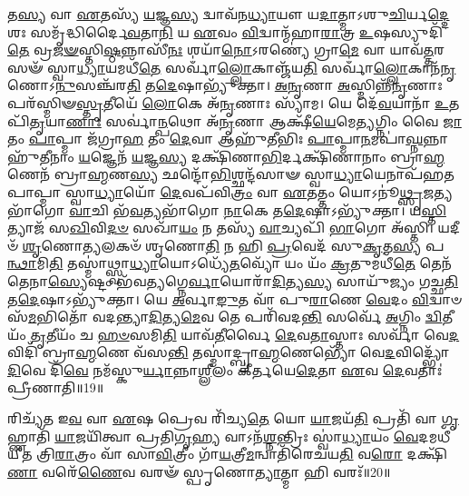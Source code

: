 𑌤\-\ul{𑌸𑍍𑌯} 𑌵𑌾 \ul{𑌏}\-𑌤𑌸𑍍𑌯᳴ \ul{𑌯}\-𑌜𑍍𑌞\-\ul{𑌸𑍍𑌯} 𑌦𑍍𑌵𑌾𑌵᳴𑌨\-\ul{𑌧𑍍𑌯𑌾}\-𑌯𑍗 𑌯\-\ul{𑌦𑌾}\-𑌤𑍍𑌮𑌾𑌽𑌶𑍁\-\ul{𑌚𑌿}\-𑌰𑍍𑌯\-\ul{𑌦𑍍𑌦𑍇}\-𑌶𑌃 𑌸𑌮𑍃᳴𑌦𑍍𑌧𑌿𑌰𑍍𑌦𑍈\-\ul{𑌵}\-𑌤𑌾\-\ul{𑌨𑌿} 𑌯 \ul{𑌏}\-𑌵𑌂 \ul{𑌵𑌿}\-𑌦𑍍𑌵𑌾𑌨𑍍𑌮᳴𑌹𑌾\-\ul{𑌰𑌾}\-𑌤𑍍𑌰 \ul{𑌉}\-𑌷𑌸𑍍𑌯𑍁𑌦𑌿᳴\-\ul{𑌤𑍇} 𑌵𑍍𑌰\-\ul{𑌜}\-\-\ul{𑍟}\-𑌸𑍍𑌤𑌿\-\ul{𑌷𑍍𑌠}\-𑌨𑍍𑌨𑌾\-𑌸𑍀᳴\-\ul{𑌨𑌃} 𑌶𑌯𑌾᳴\-\ul{𑌨𑍋}\-𑌽𑌰𑌣𑍍𑌯𑍇॑ 𑌗𑍍𑌰𑌾\-\ul{𑌮𑍇} 𑌵𑌾 𑌯𑌾𑌵᳴\-\ul{𑌤𑍍𑌤}\-𑌰𑌸𑍟᳴ 𑌸𑍍𑌵𑌾\-\ul{𑌧𑍍𑌯𑌾}\-𑌯𑌮𑌧𑍀᳴\-\ul{𑌤𑍇} 𑌸𑌰𑍍𑌵𑌾𑌁॑\-\ul{𑌲𑍍𑌲𑍋}\-𑌕𑌾𑌞𑍍𑌜᳴𑌯\-\ul{𑌤𑌿} 𑌸𑌰𑍍𑌵𑌾𑌁॑\-\ul{𑌲𑍍𑌲𑍋}\-𑌕𑌾𑌨᳴\-\ul{𑌨𑍃}\-𑌣𑍋𑌽\-\ul{𑌨𑍁}\-\-𑌸𑌞𑍍𑌚᳴𑌰\-\ul{𑌤𑌿} 𑌤\-\ul{𑌦𑍇}\-𑌷𑌾𑌭𑍍𑌯𑍁᳴𑌕𑍍𑌤𑌾। 
\-\ul{𑌅}\-\-\ul{𑌨𑍃}\-𑌣𑌾 \ul{𑌅}\-𑌸𑍍𑌮𑌿𑌨𑍍𑌨᳴\-\ul{𑌨𑍃}\-𑌣𑌾𑌃 𑌪𑌰᳴𑌸𑍍𑌮𑌿𑍟\-\-\ul{𑌸𑍍𑌤𑍃}\-𑌤𑍀𑌯𑍇᳴ \ul{𑌲𑍋}\-𑌕𑍇 𑌅᳴\-\ul{𑌨𑍃}\-𑌣𑌾𑌃 𑌸𑍍𑌯𑌾᳴𑌮। 
𑌯𑍇 𑌦𑍇᳴\-\ul{𑌵}\-𑌯𑌾𑌨𑌾᳴ \ul{𑌉}\-𑌤 𑌪𑌿᳴\-\ul{𑌤𑍃}\-𑌯𑌾\-\ul{𑌣𑌾𑌃} 𑌸𑌰𑍍𑌵𑌾॑\-\ul{𑌨𑍍𑌪}\-𑌥𑍋 𑌅᳴\-\ul{𑌨𑍃}\-𑌣𑌾 𑌆𑌕𑍍𑌷𑍀᳴\-\ul{𑌯𑍇}\-𑌮𑍇\-\ul{𑌤𑍍𑌯}\-𑌗𑍍𑌨𑌿𑌂 𑌵𑍈 \ul{𑌜𑌾}\-𑌤𑌂 \ul{𑌪𑌾}\-𑌪𑍍𑌮𑌾 𑌜᳴𑌗𑍍𑌰𑌾\-\ul{𑌹} 𑌤𑌂 \ul{𑌦𑍇}\-𑌵𑌾 𑌆𑌹𑍁᳴𑌤𑍀𑌭𑌿𑌃 \ul{𑌪𑌾}\-𑌪𑍍𑌮𑌾\-\ul{𑌨}\-𑌮𑌪𑌾॑\-\ul{𑌘𑍍𑌨}\-𑌨𑍍𑌨𑌾𑌹𑍁᳴𑌤𑍀𑌨𑌾𑌂 \ul{𑌯}\-𑌜𑍍𑌞𑍇𑌨᳴ \ul{𑌯}\-𑌜𑍍𑌞\-\ul{𑌸𑍍𑌯} 𑌦𑌕𑍍𑌷𑌿᳴𑌣𑌾\-\ul{𑌭𑌿}\-𑌰𑍍𑌦𑌕𑍍𑌷𑌿᳴𑌣𑌾𑌨𑌾𑌂 𑌬𑍍𑌰𑌾\-\ul{𑌹𑍍𑌮}\-𑌣𑍇𑌨᳴ 𑌬𑍍𑌰𑌾\-\ul{𑌹𑍍𑌮}\-𑌣\-\ul{𑌸𑍍𑌯} 𑌛𑌨𑍍𑌦𑍋᳴\-\ul{𑌭𑌿}\-𑌶𑍍𑌛𑌨𑍍𑌦᳴𑌸𑌾𑍟 𑌸𑍍𑌵𑌾\-\ul{𑌧𑍍𑌯𑌾}\-𑌯𑍇𑌨𑌾𑌪᳴𑌹𑌤𑌪𑌾𑌪𑍍𑌮𑌾 𑌸𑍍𑌵𑌾\-\ul{𑌧𑍍𑌯𑌾}\-𑌯𑍋᳴ \ul{𑌦𑍇}\-𑌵𑌪᳴𑌵𑌿\-\ul{𑌤𑍍𑌰𑌂} 𑌵𑌾 \ul{𑌏}\-𑌤𑌤𑍍𑌤𑌂 𑌯𑍋𑌽𑌨𑍂॑\-\ul{𑌥𑍍𑌸𑍃}\-𑌜𑌤𑍍𑌯𑌭𑌾᳴𑌗𑍋 \ul{𑌵𑌾}\-𑌚𑌿 𑌭᳴\-\ul{𑌵}\-𑌤𑍍𑌯𑌭𑌾᳴𑌗𑍋 \ul{𑌨𑌾}\-𑌕𑍇 𑌤\-\ul{𑌦𑍇}\-𑌷𑌾𑌽𑌭𑍍𑌯𑍁᳴𑌕𑍍𑌤𑌾। 
𑌯\-\ul{𑌸𑍍𑌤𑌿}\-𑌤𑍍𑌯𑌾𑌜᳴ 𑌸\-\ul{𑌖𑌿}\-𑌵𑌿\-\ul{𑌦}\-\-\ul{𑍞} 𑌸𑌖𑌾᳴\-\ul{𑌯𑌂} 𑌨 𑌤𑌸𑍍𑌯᳴ \ul{𑌵𑌾}\-𑌚𑍍𑌯𑌪𑌿᳴ \ul{𑌭𑌾}\-𑌗𑍋 𑌅᳴𑌸𑍍𑌤𑌿। 
𑌯𑌦𑍀𑍞᳴ \ul{𑌶𑍃}\-𑌣𑍋\-\ul{𑌤𑍍𑌯}\-𑌲𑌕𑍞᳴ 𑌶𑍃𑌣𑍋\-\ul{𑌤𑌿} 𑌨 𑌹𑌿 \ul{𑌪𑍍𑌰}\-𑌵𑍇𑌦᳴ 𑌸𑍁\-\ul{𑌕𑍃}\-𑌤\-\ul{𑌸𑍍𑌯} 𑌪\-\ul{𑌨𑍍𑌥𑌾}\-𑌮𑌿\-\ul{𑌤𑌿} 𑌤𑌸𑍍𑌮𑌾॑𑌥𑍍𑌸𑍍𑌵𑌾\-\ul{𑌧𑍍𑌯𑌾}\-𑌯𑍋𑌽𑌧𑍍𑌯𑍇᳴\-\ul{𑌤}\-𑌵𑍍𑌯𑍋᳴ 𑌯𑌂 𑌯𑌂᳴ \ul{𑌕𑍍𑌰}\-𑌤𑍁𑌮𑌧𑍀᳴\-\ul{𑌤𑍇} 𑌤𑍇𑌨᳴ 𑌤𑍇𑌨𑌾\-\ul{𑌸𑍍𑌯𑍇}\-𑌷𑍍𑌟𑌂 𑌭᳴𑌵\-\ul{𑌤𑍍𑌯}\-𑌗𑍍𑌨𑍇\-\ul{𑌰𑍍𑌵𑌾}\-𑌯𑍋𑌰𑌾᳴\-\ul{𑌦𑌿}\-𑌤𑍍𑌯\-\ul{𑌸𑍍𑌯} 𑌸𑌾𑌯𑍁᳴𑌜𑍍𑌯𑌂 𑌗𑌚𑍍𑌛\-\ul{𑌤𑌿} 𑌤\-\ul{𑌦𑍇}\-𑌷𑌾𑌽𑌭𑍍𑌯𑍁᳴𑌕𑍍𑌤𑌾। 
𑌯𑍇 \ul{𑌅}\-𑌰𑍍𑌵𑌾\-\ul{𑌙𑍁}\-𑌤 𑌵𑌾᳴ 𑌪𑍁\-\ul{𑌰𑌾}\-𑌣𑍇 \ul{𑌵𑍇}\-𑌦𑌂 \ul{𑌵𑌿}\-𑌦𑍍𑌵𑌾𑍞𑌸᳴\-\ul{𑌮}\-𑌭𑌿𑌤𑍋᳴ 𑌵𑌦𑌨𑍍𑌤𑍍𑌯𑌾\-\ul{𑌦𑌿}\-𑌤𑍍𑌯\-\ul{𑌮𑍇}\-𑌵 𑌤𑍇 𑌪𑌰𑌿᳴𑌵𑌦\-\ul{𑌨𑍍𑌤𑌿} 𑌸𑌰𑍍𑌵𑍇᳴ \ul{𑌅}\-𑌗𑍍𑌨𑌿𑌂 \ul{𑌦𑍍𑌵𑌿}\-𑌤𑍀𑌯𑌂᳴ \ul{𑌤𑍃}\-𑌤𑍀𑌯𑌂᳴ 𑌚 \ul{𑌹}\-\-\ul{𑍞}\-𑌸𑌮𑌿\-\ul{𑌤𑌿} 𑌯𑌾𑌵᳴\-\ul{𑌤𑍀}\-𑌰𑍍𑌵𑍈 \ul{𑌦𑍇}\-𑌵\-\ul{𑌤𑌾}\-𑌸𑍍𑌤𑌾𑌃 𑌸𑌰𑍍𑌵𑌾᳴ 𑌵𑍇\-\ul{𑌦}\-𑌵𑌿𑌦𑌿᳴ 𑌬𑍍𑌰𑌾\-\ul{𑌹𑍍𑌮}\-𑌣𑍇 𑌵᳴𑌸\-\ul{𑌨𑍍𑌤𑌿} 𑌤𑌸𑍍𑌮𑌾॑𑌦𑍍𑌬𑍍𑌰𑌾\-\ul{𑌹𑍍𑌮}\-𑌣𑍇𑌭𑍍𑌯𑍋᳴ 𑌵𑍇\-\ul{𑌦}\-𑌵𑌿𑌦𑍍𑌭𑍍𑌯𑍋᳴ \ul{𑌦𑌿}\-𑌵𑍇 𑌦𑌿᳴\-\ul{𑌵𑍇} 𑌨𑌮᳴𑌸𑍍𑌕𑍁\-\ul{𑌰𑍍𑌯𑌾}\-𑌨𑍍𑌨𑌾\-\ul{𑌶𑍍𑌲𑍀}\-𑌲𑌂 𑌕𑍀॑𑌰𑍍𑌤𑌯𑍇\-\ul{𑌦𑍇}\-𑌤𑌾 \ul{𑌏}\-𑌵 \ul{𑌦𑍇}\-𑌵𑌤𑌾𑌃॑ 𑌪𑍍𑌰𑍀𑌣𑌾𑌤𑌿॥19॥
\anuvakamend

𑌰𑌿𑌚𑍍𑌯᳴𑌤 𑌇\-\ul{𑌵} 𑌵𑌾 \ul{𑌏}\-𑌷 𑌪𑍍𑌰𑍇𑌵 𑌰𑌿᳴𑌚𑍍𑌯\-\ul{𑌤𑍇} 𑌯𑍋 \ul{𑌯𑌾}\-𑌜𑌯᳴\-\ul{𑌤𑌿} 𑌪𑍍𑌰𑌤𑌿᳴ 𑌵𑌾 \ul{𑌗𑍃}\-𑌹𑍍𑌣𑌾𑌤𑌿᳴ \ul{𑌯𑌾}\-𑌜𑌯𑌿᳴𑌤𑍍𑌵𑌾 𑌪𑍍𑌰𑌤𑌿\-\ul{𑌗𑍃}\-𑌹𑍍𑌯 𑌵𑌾𑌽𑌨᳴\-\ul{𑌶𑍍𑌨}\-𑌨𑍍𑌤𑍍𑌰𑌿𑌃 𑌸𑍍𑌵𑌾॑\-\ul{𑌧𑍍𑌯𑌾}\-𑌯𑌂 \ul{𑌵𑍇}\-𑌦𑌮𑌧𑍀᳴𑌯𑍀𑌤 𑌤𑍍𑌰𑌿\-\ul{𑌰𑌾}\-𑌤𑍍𑌰𑌂 𑌵𑌾᳴ 𑌸𑌾\-\ul{𑌵𑌿}\-𑌤𑍍𑌰𑍀𑌂 𑌗𑌾᳴\-\ul{𑌯}\-𑌤𑍍𑌰𑍀\-\ul{𑌮}\-𑌨𑍍𑌵𑌾𑌤𑌿᳴𑌰𑍇𑌚𑌯\-\ul{𑌤𑌿} 𑌵\-\ul{𑌰𑍋} 𑌦𑌕𑍍𑌷𑌿᳴\-\ul{𑌣𑌾} 𑌵𑌰𑍇᳴\-\ul{𑌣𑍈}\-𑌵 𑌵𑌰𑍟᳴ 𑌸𑍍𑌪𑍃𑌣𑍋\-\ul{𑌤𑍍𑌯𑌾}\-𑌤𑍍𑌮𑌾 𑌹𑌿 𑌵𑌰𑌃᳴॥20॥
\anuvakamend

